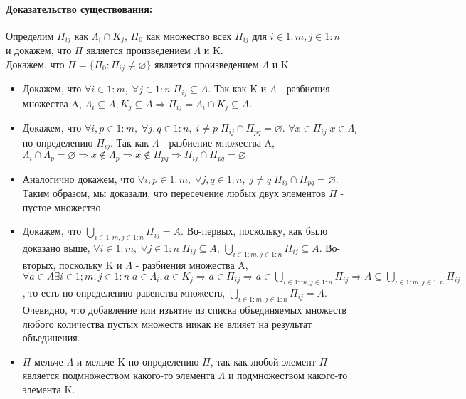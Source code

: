 \paragraph{Доказательство существования: }
$\;$ \\
Определим $\Pi_{ij}$ как $\Lambda_{i} \cap K_{j}$, $\Pi_{0}$ как множество всех $\Pi_{ij}$ для $ i \in 1 : m, j \in 1 : n$\\ и докажем, что $\Pi$ является произведением $\Lambda$ и K.\\
Докажем, что $\Pi = \{\Pi_{0} : \Pi_{ij} \not= \varnothing\}$ является произведением $\Lambda$ и K
\begin{itemize}
\item Докажем, что $\forall i \in 1 : m, \; \forall j \in 1 : n \; \Pi_{ij} \subseteq A$. Так как K и $\Lambda$ - разбиения множества A, $\Lambda_{i} \subseteq A, K_{j} \subseteq A \Rightarrow \Pi_{ij} = \Lambda_{i} \cap K_{j} \subseteq A$.
\item Докажем, что $\forall i, p \in 1 : m, \; \forall j, q \in 1 : n, \; i \not= p \; \Pi_{ij} \cap \Pi_{pq} = \varnothing$. $\forall x \in \Pi_{ij} \; x \in \Lambda_{i}$ по определению $\Pi_{ij}$. Так как $\Lambda$ - разбиение множества A, $\Lambda_{i} \cap \Lambda_{p} = \varnothing \Rightarrow x \not\in \Lambda_{p} \Rightarrow x \not\in \Pi_{pq} \Rightarrow \Pi_{ij} \cap \Pi_{pq} = \varnothing$
\item Аналогично докажем, что $\forall i, p \in 1 : m, \; \forall j, q \in 1 : n, \; j \not= q \; \Pi_{ij} \cap \Pi_{pq} = \varnothing$. Таким образом, мы доказали, что пересечение любых двух элементов $\Pi$ - пустое множество. 
\item Докажем, что $\bigcup\limits_{i \in 1 : m, j \in 1 : n}\Pi_{ij} = A$. Во-первых, поскольку, как было доказано выше, $\forall i \in 1 : m, \; \forall j \in 1 : n \; \Pi_{ij} \subseteq A$, $\bigcup\limits_{i \in 1 : m, j \in 1 : n}\Pi_{ij} \subseteq A$. Во-вторых, поскольку K и $\Lambda$ - разбиения множества A, $\forall a \in A \exists i \in 1 ; m, j \in 1 : n \; a \in \Lambda_{i}, a \in K_{j} \Rightarrow a \in \Pi_{ij} \Rightarrow a \in \bigcup\limits_{i \in 1 : m, j \in 1 : n}\Pi_{ij} \Rightarrow A \subseteq \bigcup\limits_{i \in 1 : m, j \in 1 : n}\Pi_{ij}$, то есть по определению равенства множеств, $\bigcup\limits_{i \in 1 : m, j \in 1 : n}\Pi_{ij} = A$. Очевидно, что добавление или изъятие из списка объединяемых множеств любого количества пустых множеств никак не влияет на результат объединения.
\item $\Pi$ мельче $\Lambda$ и мельче K по определению $\Pi$, так как любой элемент $\Pi$ является подмножеством какого-то элемента $\Lambda$ и подмножеством какого-то элемента K.

\end{itemize}
